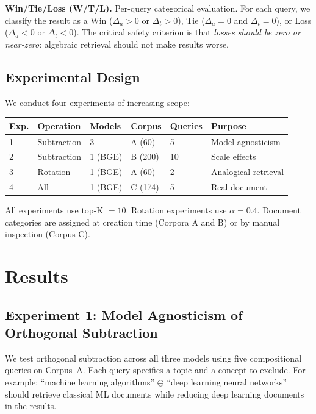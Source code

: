 \documentclass{article}
\begin{document}
\textbf{Win/Tie/Loss (W/T/L).} Per-query categorical evaluation. For each query, we classify the result as a Win ($\Delta_a > 0$ or $\Delta_t > 0$), Tie ($\Delta_a = 0$ and $\Delta_t = 0$), or Loss ($\Delta_a < 0$ or $\Delta_t < 0$). The critical safety criterion is that \emph{losses should be zero or near-zero}: algebraic retrieval should not make results worse.

\subsection{Experimental Design}

We conduct four experiments of increasing scope:

\begin{table}[h]
\centering
\begin{tabular}{llllll}
\toprule
Exp. & Operation & Models & Corpus & Queries & Purpose \\
\midrule
1 & Subtraction & 3 & A (60) & 5 & Model agnosticism \\
2 & Subtraction & 1 (BGE) & B (200) & 10 & Scale effects \\
3 & Rotation & 1 (BGE) & A (60) & 2 & Analogical retrieval \\
4 & All & 1 (BGE) & C (174) & 5 & Real document \\
\bottomrule
\end{tabular}
\end{table}

All experiments use top-K $= 10$. Rotation experiments use $\alpha = 0.4$. Document categories are assigned at creation time (Corpora A and B) or by manual inspection (Corpus C).

\section{Results}

\subsection{Experiment 1: Model Agnosticism of Orthogonal Subtraction}

We test orthogonal subtraction across all three models using five compositional queries on Corpus~A. Each query specifies a topic and a concept to exclude. For example: ``machine learning algorithms'' $\ominus$ ``deep learning neural networks'' should retrieve classical ML documents while reducing deep learning documents in the results.
\end{document}
